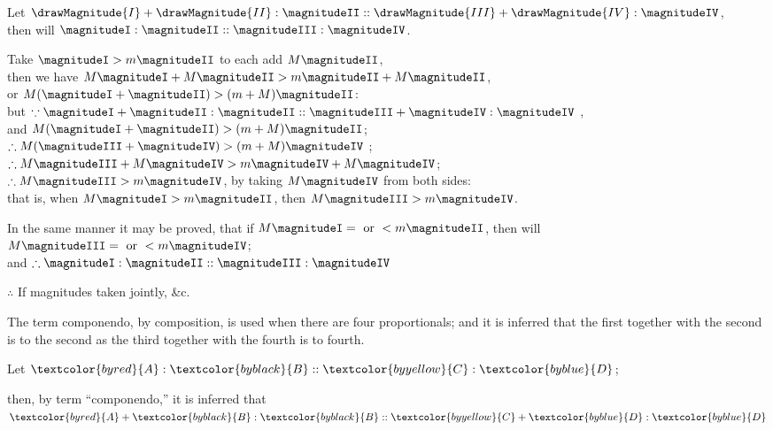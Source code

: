 \documentclass[booklanguage=english]{byrnebook}
\begin{document}
\begin{center}
Let $\drawMagnitude{I} + \drawMagnitude{II} : \magnitudeII :: \drawMagnitude{III} + \drawMagnitude{IV} : \magnitudeIV$,\\
then will $\magnitudeI : \magnitudeII :: \magnitudeIII : \magnitudeIV$.

Take $\magnitudeI > m \magnitudeII$ to each add $M \magnitudeII$,\\
then we have $M \magnitudeI + M \magnitudeII > m \magnitudeII + M \magnitudeII$,\\
or $M (\magnitudeI + \magnitudeII) > (m + M) \magnitudeII$:\\
but $\because \magnitudeI + \magnitudeII: \magnitudeII :: \magnitudeIII + \magnitudeIV: \magnitudeIV$ \byref{\hypref},\\ %
and $M (\magnitudeI + \magnitudeII) > (m + M) \magnitudeII$;\\
$\therefore M(\magnitudeIII + \magnitudeIV) > (m + M) \magnitudeIV$ ;\\
$\therefore M \magnitudeIII + M \magnitudeIV > m \magnitudeIV + M \magnitudeIV$;\\
$\therefore M \magnitudeIII > m \magnitudeIV$, by taking $M \magnitudeIV$ from both sides:\\
that is, when $M \magnitudeI > m \magnitudeII$, then $M \magnitudeIII > m \magnitudeIV$.

In the same manner it may be proved, that if $M \magnitudeI = \mbox{ or } < m \magnitudeII$, then will $M \magnitudeIII = \mbox{ or } < m \magnitudeIV$;\\
and $\therefore \magnitudeI : \magnitudeII :: \magnitudeIII : \magnitudeIV$ 

$\therefore$ If magnitudes taken jointly, \&c.
\end{center}

\vfill\pagebreak

\label{def:V.XV} 
\def\varA{\textcolor{byred}{A}}
\def\varB{\textcolor{byblack}{B}}
\def\varC{\textcolor{byyellow}{C}}
\def\varD{\textcolor{byblue}{D}}
The term componendo, by composition, is used when there are four proportionals; and it is inferred that the first together with the second is to the second as the third together with the fourth is to fourth.

\begin{center}
Let $\varA : \varB :: \varC : \varD$;

then, by term \enquote{componendo,} it is inferred that\\
$\varA + \varB : \varB :: \varC + \varD: \varD$
\end{center}
\end{document}

